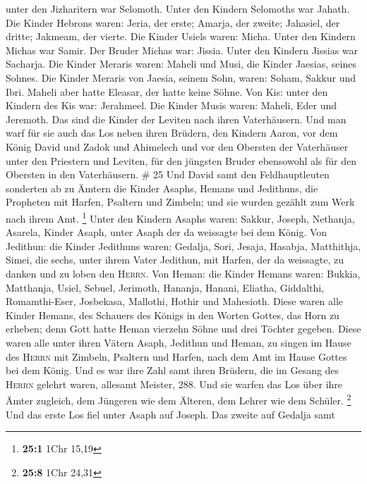 unter den Jizharitern war Selomoth. Unter den Kindern Selomoths war
Jahath.  Die Kinder Hebrons waren: Jeria, der erste;
Amarja, der zweite; Jahasiel, der dritte; Jakmeam, der vierte.
 Die Kinder Usiels waren: Micha. Unter den Kindern Michas
war Samir.  Der Bruder Michas war: Jissia. Unter den
Kindern Jissias war Sacharja.  Die Kinder Meraris waren:
Maheli und Musi, die Kinder Jaesias, seines Sohnes.  Die
Kinder Meraris von Jaesia, seinem Sohn, waren: Soham, Sakkur und Ibri.
 Maheli aber hatte Eleasar, der hatte keine Söhne.
 Von Kis: unter den Kindern des Kis war: Jerahmeel.
 Die Kinder Musis waren: Maheli, Eder und Jeremoth. Das
sind die Kinder der Leviten nach ihren Vaterhäusern.  Und
man warf für sie auch das Los neben ihren Brüdern, den Kindern Aaron,
vor dem König David und Zadok und Ahimelech und vor den Obersten der
Vaterhäuser unter den Priestern und Leviten, für den jüngsten Bruder
ebensowohl als für den Obersten in den Vaterhäusern. \# 25
 Und David samt den Feldhauptleuten sonderten ab zu Ämtern
die Kinder Asaphs, Hemans und Jedithuns, die Propheten mit Harfen,
Psaltern und Zimbeln; und sie wurden gezählt zum Werk nach ihrem Amt.
\footnote{\textbf{25:1} 1Chr 15,19}  Unter den Kindern
Asaphs waren: Sakkur, Joseph, Nethanja, Asarela, Kinder Asaph, unter
Asaph der da weissagte bei dem König.  Von Jedithun: die
Kinder Jedithuns waren: Gedalja, Sori, Jesaja, Hasabja, Matthithja,
Simei, die sechs, unter ihrem Vater Jedithun, mit Harfen, der da
weissagte, zu danken und zu loben den \textsc{Herrn}.  Von
Heman: die Kinder Hemans waren: Bukkia, Matthanja, Usiel, Sebuel,
Jerimoth, Hananja, Hanani, Eliatha, Giddalthi, Romamthi-Eser, Josbekasa,
Mallothi, Hothir und Mahesioth.  Diese waren alle Kinder
Hemans, des Schauers des Königs in den Worten Gottes, das Horn zu
erheben; denn Gott hatte Heman vierzehn Söhne und drei Töchter gegeben.
 Diese waren alle unter ihren Vätern Asaph, Jedithun und
Heman, zu singen im Hause des \textsc{Herrn} mit Zimbeln, Psaltern und
Harfen, nach dem Amt im Hause Gottes bei dem König.  Und
es war ihre Zahl samt ihren Brüdern, die im Gesang des \textsc{Herrn}
gelehrt waren, allesamt Meister, 288.  Und sie warfen das
Los über ihre Ämter zugleich, dem Jüngeren wie dem Älteren, dem Lehrer
wie dem Schüler. \footnote{\textbf{25:8} 1Chr 24,31}  Und
das erste Los fiel unter Asaph auf Joseph. Das zweite auf Gedalja samt
